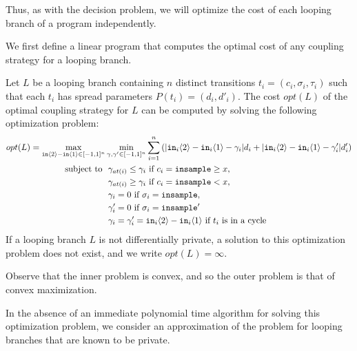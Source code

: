 Thus, as with the decision problem, we will optimize the cost of each looping branch of a program independently.

We first define a linear program that computes the optimal cost of any coupling strategy for a looping branch. 

\begin{prop}
    \label{prop:compute_opt_cost}
    Let $L$ be a looping branch containing $n$ distinct transitions $t_i = (c_i, \sigma_i, \tau_i)$ such that each $t_i$ has spread parameters $P(t_i) = (d_i, d'_i)$. The cost $opt(L)$ of the optimal coupling strategy for $L$ can be computed by solving the following optimization problem: 
    \begin{align*}
        opt(L) = \max_{\texttt{in}\langle2 \rangle-\texttt{in}\langle1 \rangle \in [-1, 1]^n} &\min_{\gamma, \gamma' \in [-1, 1]^n} \sum_{i = 1}^n \left(|\texttt{in}_i\langle2 \rangle-\texttt{in}_i\langle1 \rangle - \gamma_i| d_i + |\texttt{in}_i\langle2 \rangle-\texttt{in}_i\langle1 \rangle - \gamma_i'|d_i' \right)\\ 
            \text{subject to }
            &\ \gamma_{at(i)} \leq \gamma_i \text{ if } c_i = \texttt{insample}\geq x, \\
            &\ \gamma_{at(i)} \geq \gamma_i \text{ if } c_i = \texttt{insample} < x, \\
            &\ \gamma_i = 0 \text{ if } \sigma_i = \texttt{insample}, \\
            &\ \gamma_i' = 0 \text{ if } \sigma_i = \texttt{insample}'\\
            &\ \gamma_i = \gamma_i'= \texttt{in}_i\langle2 \rangle-\texttt{in}_i\langle1 \rangle \text{ if } t_i \text{ is in a cycle}
    \end{align*}
    If a looping branch $L$ is not differentially private, a solution to this optimization problem does not exist, and we write $opt(L) = \infty$.
\end{prop}

Observe that the inner problem is convex, and so the outer problem is that of convex maximization. 

In the absence of an immediate polynomial time algorithm  for solving this optimization problem, we consider an approximation of the problem for looping branches that are known to be private. 

